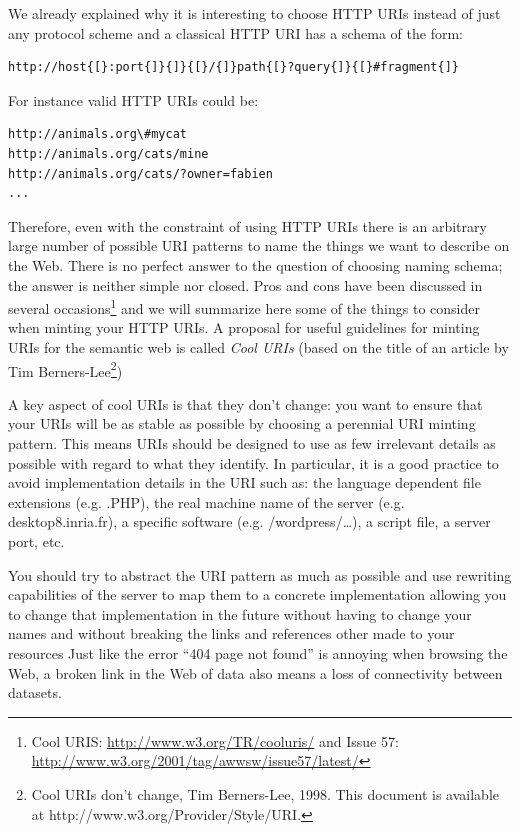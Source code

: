 We already explained why it is interesting to choose HTTP URIs instead
of just any protocol scheme and a classical HTTP URI has a schema of
the form:

\begin{lstlisting}
http://host{[}:port{]}{]}{[}/{]}path{[}?query{]}{[}#fragment{]}
\end{lstlisting}


For instance valid HTTP URIs could be:

\begin{lstlisting}
http://animals.org\#mycat
http://animals.org/cats/mine
http://animals.org/cats/?owner=fabien
...
\end{lstlisting}


Therefore, even with the constraint of using HTTP URIs there is an
arbitrary large number of possible URI patterns to name the things we
want to describe on the Web. There is no perfect answer to the question
of choosing naming schema; the answer is neither simple nor closed. Pros
and cons have been discussed in several occasions\footnote{Cool URIS:
  \url{http://www.w3.org/TR/cooluris/} and Issue 57:
  \url{http://www.w3.org/2001/tag/awwsw/issue57/latest/}} and we will
summarize here some of the things to consider when minting your HTTP
URIs. A proposal for useful guidelines for minting URIs for the semantic
web is called \emph{Cool URIs} (based on the title of an article by Tim
Berners-Lee\footnote{Cool URIs don't change, Tim Berners-Lee, 1998. This
  document is available at http://www.w3.org/Provider/Style/URI.})

A key aspect of cool URIs is that they don't change: you want to ensure
that your URIs will be as stable as possible by choosing a perennial URI
minting pattern. This means URIs should be designed to use as few
irrelevant details as possible with regard to what they identify. In
particular, it is a good practice to avoid implementation details in the
URI such as: the language dependent file extensions (e.g. .PHP), the
real machine name of the server (e.g. desktop8.inria.fr), a specific
software (e.g. /wordpress/\ldots{}), a script file, a server port, etc.

You should try to abstract the URI pattern as much as possible and use
rewriting capabilities of the server to map them to a concrete
implementation allowing you to change that implementation in the future
without having to change your names and without breaking the links and
references other made to your resources Just like the error ``404 page
not found'' is annoying when browsing the Web, a broken link in the Web
of data also means a loss of connectivity between datasets.

